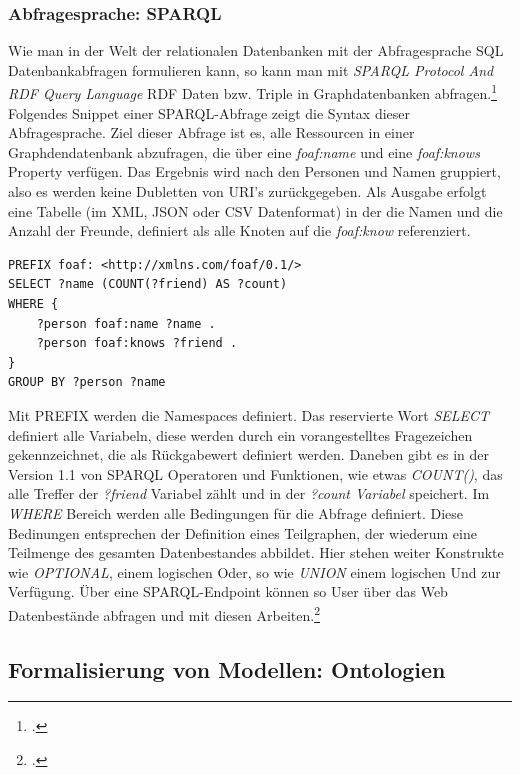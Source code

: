 \documentclass[12pt,a4paper]{article}
\begin{document}
\subsubsection{Abfragesprache: SPARQL}
Wie man in der Welt der relationalen Datenbanken mit der Abfragesprache SQL Datenbankabfragen formulieren kann, so kann man mit \textit{SPARQL Protocol And RDF Query Language} RDF Daten bzw. Triple in Graphdatenbanken abfragen.\footcite[][]{w3c2013sparql}
\\
Folgendes Snippet einer SPARQL-Abfrage zeigt die Syntax dieser Abfragesprache. Ziel dieser Abfrage ist es, alle Ressourcen in einer Graphdendatenbank abzufragen, die über eine \textit{foaf:name} und eine \textit{foaf:knows} Property verfügen. Das Ergebnis wird nach den Personen und Namen gruppiert, also es werden keine Dubletten von URI's zurückgegeben. Als Ausgabe erfolgt eine Tabelle (im XML, JSON oder CSV Datenformat) in der die Namen und die Anzahl der Freunde, definiert als alle Knoten auf die \textit{foaf:know} referenziert.
\begin{lstlisting}[]
PREFIX foaf: <http://xmlns.com/foaf/0.1/>
SELECT ?name (COUNT(?friend) AS ?count)
WHERE { 
    ?person foaf:name ?name . 
    ?person foaf:knows ?friend . 
} 
GROUP BY ?person ?name
\end{lstlisting}
Mit PREFIX werden die Namespaces definiert. Das reservierte Wort \textit{SELECT} definiert alle Variabeln, diese werden durch ein vorangestelltes Fragezeichen gekennzeichnet, die als Rückgabewert definiert werden. Daneben gibt es in der Version 1.1 von SPARQL Operatoren und Funktionen, wie etwas \textit{COUNT()}, das alle Treffer der \textit{?friend} Variabel zählt und in der \textit{?count Variabel} speichert. Im \textit{WHERE} Bereich werden alle Bedingungen für die Abfrage definiert. Diese Bedinungen entsprechen der Definition eines Teilgraphen, der wiederum eine Teilmenge des gesamten Datenbestandes abbildet. Hier stehen weiter Konstrukte wie \textit{OPTIONAL}, einem logischen Oder, so wie \textit{UNION} einem logischen Und zur Verfügung. Über eine SPARQL-Endpoint können so User über das Web Datenbestände abfragen und mit diesen Arbeiten.\footcite[][S.1-45]{ducharme2013learning}


\subsection{Formalisierung von Modellen: Ontologien}
\label{Ontologie}
\end{document}
